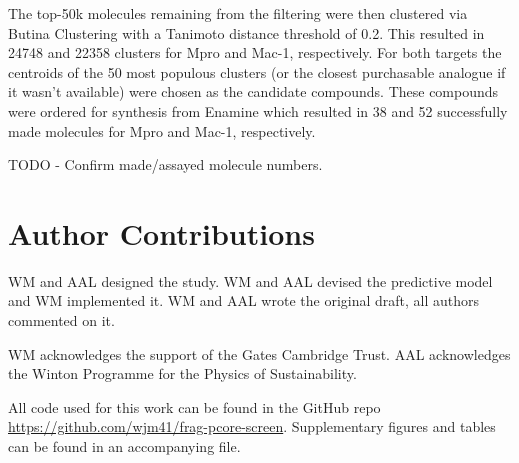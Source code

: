 \documentclass[journal=jacsat,manuscript=article]{achemso}
\begin{document}
The top-50k molecules remaining from the filtering were then clustered via Butina Clustering \cite{Butina1999Clustering} with a Tanimoto distance threshold of 0.2. This resulted in 24748 and 22358 clusters for Mpro and Mac-1, respectively. For both targets the centroids of the 50 most populous clusters (or the closest purchasable analogue if it wasn't available) were chosen as the candidate compounds. These compounds were ordered for synthesis from Enamine which resulted in 38 and 52 successfully made molecules for Mpro and Mac-1, respectively.

TODO - Confirm made/assayed molecule numbers.

\section{Author Contributions}
WM and AAL designed the study. WM and AAL devised the predictive model and WM implemented it. WM and AAL wrote the original draft, all authors commented on it.

\begin{acknowledgement}

WM acknowledges the support of the Gates Cambridge Trust. AAL acknowledges the Winton Programme for the Physics of Sustainability.

\end{acknowledgement}

\begin{suppinfo}

All code used for this work can be found in the GitHub repo \url{https://github.com/wjm41/frag-pcore-screen}. Supplementary figures and tables can be found in an accompanying file.

\end{suppinfo}


\end{document}
